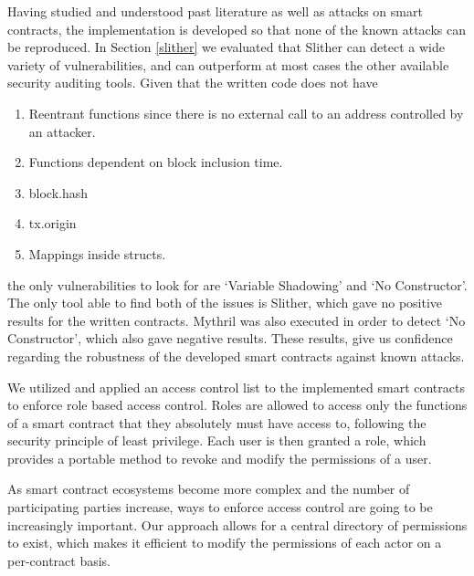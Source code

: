 Having studied and understood past literature as well as attacks on smart contracts, the implementation is developed so that none of the known attacks can be reproduced. In Section \ref{slither} we evaluated that Slither can detect a wide variety of vulnerabilities, and can outperform at most cases the other available security auditing tools. Given that the written code does not have
\begin{enumerate}
    \item Reentrant functions since there is no external call to an address controlled by an attacker.
    \item Functions dependent on block inclusion time.
    \item block.hash
    \item tx.origin
    \item Mappings inside structs.
\end{enumerate} 

the only vulnerabilities to look for are `Variable Shadowing' and `No Constructor'. The only tool able to find both of the issues is Slither, which gave no positive results for the written contracts. Mythril was also executed in order to detect `No Constructor', which also gave negative results. These results, give us confidence regarding the robustness of the developed smart contracts against known attacks. 

We utilized and applied an access control list to the implemented smart contracts to enforce role based access control. Roles are allowed to access only the functions of a smart contract that they absolutely must have access to, following the security principle of least privilege. Each user is then granted a role, which provides a portable method to revoke and modify the permissions of a user. 

As smart contract ecosystems become more complex and the number of participating parties increase, ways to enforce access control are going to be increasingly important. Our approach allows for a central directory of permissions to exist, which makes it efficient to modify the permissions of each actor on a per-contract basis. 

